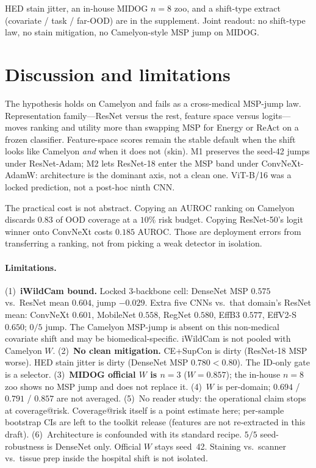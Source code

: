 \documentclass[10pt,twocolumn,letterpaper]{article}
\begin{document}
HED stain jitter, an in-house MIDOG $n{=}8$ zoo, and a shift-type extract (covariate / task / far-OOD) are in the supplement.
Joint readout: no shift-type law, no stain mitigation, no Camelyon-style MSP jump on MIDOG.

\section{Discussion and limitations}

The hypothesis holds on Camelyon and fails as a cross-medical MSP-jump law.
Representation family---ResNet versus the rest, feature space versus logits---moves ranking and utility more than swapping MSP for Energy or ReAct on a frozen classifier.
Feature-space scores remain the stable default when the shift looks like Camelyon \emph{and} when it does not (skin).
M1 preserves the seed-42 jumps under ResNet-Adam; M2 lets ResNet-18 enter the MSP band under ConvNeXt-AdamW: architecture is the dominant axis, not a clean one.
ViT-B/16 was a locked prediction, not a post-hoc ninth CNN.

The practical cost is not abstract.
Copying an AUROC ranking on Camelyon discards $0.83$ of OOD coverage at a $10\%$ risk budget.
Copying ResNet-50's logit winner onto ConvNeXt costs $0.185$ AUROC.
Those are deployment errors from transferring a ranking, not from picking a weak detector in isolation.

\paragraph{Limitations.}
(1)~\textbf{iWildCam bound.}
Locked 3-backbone cell: DenseNet MSP $0.575$ vs.\ ResNet mean $0.604$, jump $-0.029$.
Extra five CNNs vs.\ that domain's ResNet mean: ConvNeXt $0.601$, MobileNet $0.558$, RegNet $0.580$, EffB3 $0.577$, EffV2-S $0.650$; $0/5$ jump.
The Camelyon MSP-jump is absent on this non-medical covariate shift and may be biomedical-specific.
iWildCam is not pooled with Camelyon $W$.
(2)~\textbf{No clean mitigation.}
CE{+}SupCon is dirty (ResNet-18 MSP worse).
HED stain jitter is dirty (DenseNet MSP $0.780{<}0.80$).
The ID-only gate is a selector.
(3)~\textbf{MIDOG official $W$ is $n{=}3$} ($W{=}0.857$); the in-house $n{=}8$ zoo shows no MSP jump and does not replace it.
(4)~$W$ is per-domain; $0.694$ / $0.791$ / $0.857$ are not averaged.
(5)~No reader study: the operational claim stops at coverage@risk.
Coverage@risk itself is a point estimate here; per-sample bootstrap CIs are left to the toolkit release (features are not re-extracted in this draft).
(6)~Architecture is confounded with its standard recipe.
$5/5$ seed-robustness is DenseNet only.
Official $W$ stays seed~42.
Staining vs.\ scanner vs.\ tissue prep inside the hospital shift is not isolated.
\end{document}
